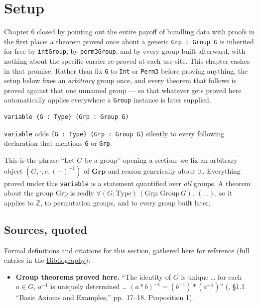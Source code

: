\section{Setup}\label{sec:07-group-theorems:01-setup:1}

Chapter 6 closed by pointing out the entire payoff of bundling data with proofs in the first place: a theorem proved once about a generic \texttt{Grp : Group G} is inherited for free by \texttt{intGroup}, by \texttt{perm3Group}, and by every group built afterward, with nothing about the specific carrier re-proved at each use site. This chapter cashes in that promise. Rather than fix \texttt{G} to \texttt{Int} or \texttt{Perm3} before proving anything, the setup below fixes an \emph{arbitrary} group once, and every theorem that follows is proved against that one unnamed group --- so that whatever gets proved here automatically applies everywhere a \texttt{Group} instance is later supplied.

\begin{lstlisting}
variable {G : Type} (Grp : Group G)
\end{lstlisting}

\texttt{variable} adds \texttt{\{G : Type\} (Grp : Group G)} silently to every following declaration that mentions \texttt{G} or \texttt{Grp}.

\begin{mathreading}

This is the phrase ``Let \(G\) be a group'' opening a section: we fix an arbitrary object \((G, \cdot, e, (-)^{-1})\) of \(\mathbf{Grp}\) and reason generically about it. Everything proved under this \texttt{variable} is a statement quantified over \emph{all} groups. A theorem about the group \(\mathrm{Grp}\) is really \(\forall (G : \mathrm{Type})\,(\mathrm{Grp} :
\mathrm{Group}\,G),\ (\ldots)\), so it applies to \(\mathbb{Z}\), to permutation groups, and to every group built later.

\end{mathreading}

\subsection{Sources, quoted}\label{sec:07-group-theorems:01-setup:2}

Formal definitions and citations for this section, gathered here for reference (full entries in the \hyperref[sec:root:bibliography:1]{Bibliography}):

\begin{itemize}
\tightlist
\item
  \textbf{Group theorems proved here.} ``The identity of \(G\) is unique \ldots{} for each \(a \in G\), \(a^{-1}\) is uniquely determined \ldots{} \((a{*}b)^{-1} = (b^{-1}){*}(a^{-1})\)'' (\cite{DummitFoote2003}, §1.1 ``Basic Axioms and Examples,'' pp.~17--18, Proposition 1).
\end{itemize}
